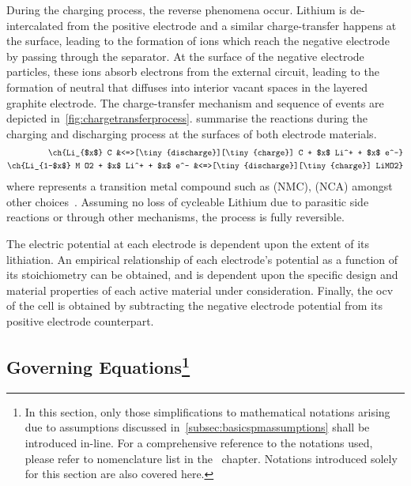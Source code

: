 During  the   charging  process,  the   reverse  phenomena  occur.   Lithium  is
de-intercalated  from  the  positive  electrode and  a  similar  charge-transfer
happens  at the  surface,  leading  to the  formation  of   ions  which
reach  the  negative  electrode  by   passing  through  the  separator.  At  the
surface  of  the  negative  electrode particles,  these  ions  absorb  electrons
from  the  external circuit,  leading  to  the  formation of  neutral  
that   diffuses  into   interior   vacant  spaces   in   the  layered   graphite
electrode. The  charge-transfer mechanism  and sequence  of events  are depicted
in~\cref{fig:chargetransferprocess}.
 summarise the reactions during the
charging and discharging process at the surfaces of both electrode materials.
\tikzexternaldisable
\begin{align}
    \ch{Li_{$x$} C &<=>[\tiny{discharge}][\tiny{charge}] C + $x$ Li^+ + $x$ e^-}\label{eq:NegElectrodeRxn}\\
    \ch{Li_{1-$x$} M O2 + $x$ Li^+  + $x$ e^- &<=>[\tiny{discharge}][\tiny{charge}] LiMO2}\label{eq:PosElectrodeRxn}
\end{align}
\tikzexternalenable
where       represents    a    transition   metal    compound   such    as
   (NMC),      (NCA)
amongst other  choices~\cite{Reddy2011}. Assuming  no loss of  cycleable Lithium
due to  parasitic side  reactions or  through other  mechanisms, the  process is
fully reversible.


The  electric potential  at  each  electrode is  dependent  upon  the extent  of
its  lithiation. An  empirical  relationship of  each  electrode's potential  as
a  function  of  its  stoichiometry  can be  obtained,  and  is  dependent  upon
the  specific design  and  material  properties of  each  active material  under
consideration. Finally, the \gls{ocv} of the cell is obtained by subtracting the
negative electrode potential from its positive electrode counterpart.

\subsection[Governing  Equations]{Governing  Equations\protect\footnote{In  this
section,   only  those   simplifications  to   mathematical  notations   arising
due  to  assumptions  discussed  in~\cref{subsec:basicspmassumptions}  shall  be
introduced   in-line.   For  a   comprehensive   reference   to  the   notations
used,   please  refer   to   nomenclature   list  in   the~
chapter.  Notations  introduced  solely  for   this  section  are  also  covered
here.}}\label{subsec:basicspmgoverningeqns}


